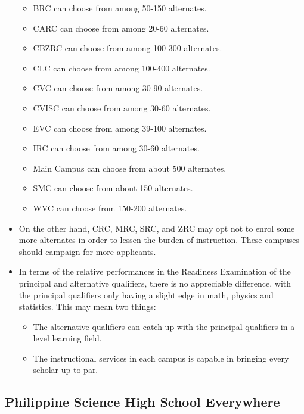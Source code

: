 \documentclass[]{article}
\providecommand{\tightlist}{%
  \setlength{\itemsep}{0pt}\setlength{\parskip}{0pt}}
\begin{document}
\begin{itemize}
  \begin{itemize}
  \tightlist
  \item
    BRC can choose from among 50-150 alternates.
  \item
    CARC can choose from among 20-60 alternates.
  \item
    CBZRC can choose from among 100-300 alternates.
  \item
    CLC can choose from among 100-400 alternates.
  \item
    CVC can choose from among 30-90 alternates.
  \item
    CVISC can choose from among 30-60 alternates.
  \item
    EVC can choose from among 39-100 alternates.
  \item
    IRC can choose from among 30-60 alternates.
  \item
    Main Campus can choose from about 500 alternates.
  \item
    SMC can choose from about 150 alternates.
  \item
    WVC can choose from 150-200 alternates.
  \end{itemize}
\item
  On the other hand, CRC, MRC, SRC, and ZRC may opt not to enrol some
  more alternates in order to lessen the burden of instruction. These
  campuses should campaign for more applicants.
\item
  In terms of the relative performances in the Readiness Examination of
  the principal and alternative qualifiers, there is no appreciable
  difference, with the principal qualifiers only having a slight edge in
  math, physics and statistics. This may mean two things:

  \begin{itemize}
  \tightlist
  \item
    The alternative qualifiers can catch up with the principal
    qualifiers in a level learning field.
  \item
    The instructional services in each campus is capable in bringing
    every scholar up to par.
  \end{itemize}
\end{itemize}

\hypertarget{philippine-science-high-school-everywhere}{%
\subsection{Philippine Science High School
Everywhere}\label{philippine-science-high-school-everywhere}}
\end{document}
